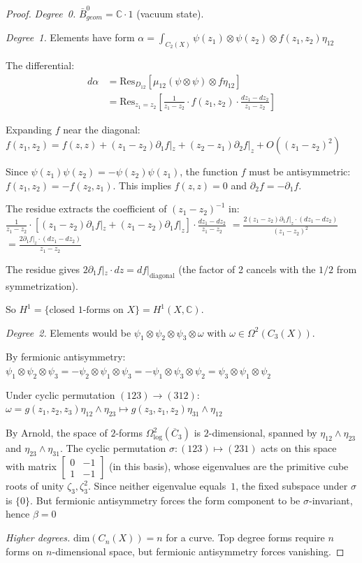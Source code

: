 \begin{proof}
\emph{Degree~0.} $\bar{B}^0_{geom} = \mathbb{C} \cdot 1$ (vacuum state).

\emph{Degree~1.} Elements have form
$\alpha = \int_{C_2(X)} \psi(z_1) \otimes \psi(z_2) \otimes f(z_1,z_2)\eta_{12}$

The differential:
\begin{align}
d\alpha &= \text{Res}_{D_{12}}[\mu_{12}(\psi \otimes \psi) \otimes f\eta_{12}]\\
&= \text{Res}_{z_1=z_2}\left[\frac{1}{z_1-z_2} \cdot f(z_1,z_2) \cdot \frac{dz_1-dz_2}{z_1-z_2}\right]
\end{align}

Expanding $f$ near the diagonal:
$f(z_1, z_2) = f(z, z) + (z_1 - z_2)\partial_1 f|_z + (z_2 - z_1)\partial_2 f|_z + O((z_1 - z_2)^2)$

Since $\psi(z_1)\psi(z_2) = -\psi(z_2)\psi(z_1)$, the function $f$ must be antisymmetric: $f(z_1, z_2) = -f(z_2, z_1)$. This implies $f(z, z) = 0$ and $\partial_2 f = -\partial_1 f$. 

The residue extracts the coefficient of $(z_1 - z_2)^{-1}$ in:
$\frac{1}{z_1 - z_2} \cdot [(z_1 - z_2)\partial_1 f|_z + (z_1 - z_2)\partial_1 f|_z] \cdot \frac{dz_1 - dz_2}{z_1 - z_2}$
$= \frac{2(z_1 - z_2)\partial_1 f|_z \cdot (dz_1 - dz_2)}{(z_1 - z_2)^2}$
$= \frac{2\partial_1 f|_z \cdot (dz_1 - dz_2)}{z_1 - z_2}$

The residue gives $2\partial_1 f|_z \cdot dz = df|_{\text{diagonal}}$ (the factor of 2 cancels with the $1/2$ from symmetrization).

So $H^1 = \{\text{closed 1-forms on } X\} = H^1(X, \mathbb{C})$.

\emph{Degree~2.} Elements would be $\psi_1 \otimes \psi_2 \otimes \psi_3 \otimes \omega$ with $\omega \in \Omega^2(C_3(X))$.

By fermionic antisymmetry:
$\psi_1 \otimes \psi_2 \otimes \psi_3 = -\psi_2 \otimes \psi_1 \otimes \psi_3 = -\psi_1 \otimes \psi_3 \otimes \psi_2 = \psi_3 \otimes \psi_1 \otimes \psi_2$

Under cyclic permutation $(123) \to (312)$:
$\omega = g(z_1,z_2,z_3)\eta_{12} \wedge \eta_{23} \mapsto g(z_3,z_1,z_2)\eta_{31} \wedge \eta_{12}$

By Arnold, the space of $2$-forms $\Omega^2_{\log}(\overline{C}_3)$ is $2$-dimensional, spanned by $\eta_{12} \wedge \eta_{23}$ and $\eta_{23} \wedge \eta_{31}$.  The cyclic permutation $\sigma: (123) \mapsto (231)$ acts on this space with matrix
$\left[\begin{smallmatrix} 0 & -1 \\ 1 & -1 \end{smallmatrix}\right]$
(in this basis), whose eigenvalues are the primitive cube roots of unity $\zeta_3, \zeta_3^2$.  Since neither eigenvalue equals~$1$, the fixed subspace under $\sigma$ is $\{0\}$.  But fermionic antisymmetry forces the form component to be $\sigma$-invariant, hence $\beta = 0$

\emph{Higher degrees.} $\text{dim}(C_n(X)) = n$ for a curve. Top degree forms require $n$ forms on $n$-dimensional space, but fermionic antisymmetry forces vanishing.
\end{proof}

